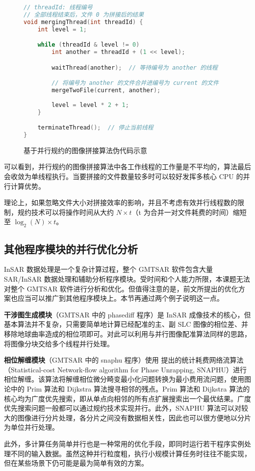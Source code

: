 \begin{figure}[htbp]
\begin{lstlisting}[language=C]
// threadId: 线程编号
// 全部线程结束后，文件 0 为拼接后的结果
void mergingThread(int threadId) {
    int level = 1;

    while (threadId & level != 0)
        int another = threadId + (1 << level);

        waitThread(another);  // 等待编号为 another 的线程

        // 将编号为 another 的文件合并进编号为 current 的文件
        mergeTwoFile(current, another);
        
        level = level * 2 + 1;
    }

    terminateThread();  // 停止当前线程
}
\end{lstlisting}
\caption{基于并行规约的图像拼接算法伪代码示意}
\label{fig:reduce-algo}
\end{figure}

可以看到，并行规约的图像拼接算法中各工作线程的工作量是不平均的，算法最后会收敛为单线程执行。当要拼接的文件数量较多时可以较好发挥多核心 CPU 的并行计算优势。

理论上，如果忽略文件大小对拼接效率的影响，并且不考虑有效并行线程数的限制，规约技术可以将操作时间从大约 $N \times t$（t 为合并一对文件耗费的时间）缩短至 $\log_2(N) \times t$。

\subsection{其他程序模块的并行优化分析}

InSAR 数据处理是一个复杂计算过程，整个 GMTSAR 软件包含大量 SAR/InSAR 数据处理和辅助分析程序模块。受时间和个人能力所限，本课题无法对整个 GMTSAR 软件进行分析和优化。但值得注意的是，前文所提出的优化方案也应当可以推广到其他程序模块上。本节再通过两个例子说明这一点。

\textbf{干涉图生成模块}（GMTSAR 中的 phasediff 程序）是 InSAR 成像技术的核心，但基本算法并不复杂，只需要简单地计算已经配准的主、副 SLC 图像的相位差、并移除地球曲率造成的相位项即可。对此可以利用与并行图像配准算法同样的思路，将图像分块交给多个线程并行处理。

\textbf{相位解缠模块}（GMTSAR 中的 snaphu 程序）使用 \citet{chen2002phase} 提出的统计耗费网络流算法（Statistical-cost Network-flow algorithm for Phase Unrapping, SNAPHU）进行相位解缠。该算法将解缠相位微分畸变最小化问题转换为最小费用流问题，使用图论中的 Prim 算法和 Dijkstra 算法搜寻相邻的残点\cite{cheng2007insar}。Prim 算法和 Dijkstra 算法的核心均为广度优先搜索，即从单点向相邻的所有点扩展搜索出一个最优结果。广度优先搜索问题一般都可以通过规约技术实现并行。此外，SNAPHU 算法可以对较大的图像进行分片处理，各分片之间没有数据相关性，因此也可以很方便地以分片为单位并行处理。

此外，多计算任务简单并行也是一种常用的优化手段，即同时运行若干程序实例处理不同的输入数据。虽然这种并行粒度粗，执行小规模计算任务时往往不能实现，但在某些场景下仍可能是最为简单有效的方案。
